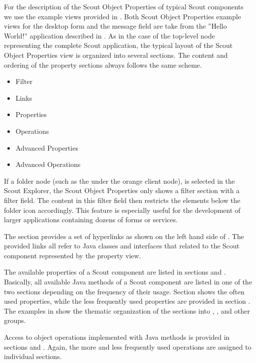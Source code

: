 \documentclass[a4paper,10pt,twoside]{book}
\begin{document}
For the description of the Scout Object Properties of typical Scout components we use the example views provided in . 
Both Scout Object Properties example views for the desktop form and the message field are take from the ''Hello World!'' application described in . 
As in the case of the top-level node representing the complete Scout application, the typical layout of the Scout Object Properties view is organized into several sections. 
The content and ordering of the property sections always follows the same scheme.

\begin{itemize}
  \item Filter
  \item Links
  \item Properties
  \item Operations
  \item Advanced Properties
  \item Advanced Operations
\end{itemize}

If a folder node (such as the  under the orange client node), is selected in the Scout Explorer, the Scout Object Properties only shows a filter section with a filter field. 
The content in this filter field then restricts the elements below the folder icon accordingly. 
This feature is especially useful for the development of larger applications containing dozens of forms or services. 

The  section provides a set of hyperlinks as shown on the left hand side of . 
The provided links all refer to Java classes and interfaces that related to the Scout component represented by the property view. 

The available properties of a Scout component are listed in sections  and . 
Basically, all available Java  methods of a Scout component are listed in one of the two sections depending on the frequency of their usage. 
Section  shows the often used properties, while the less frequently used properties are provided in section . 
The examples in  show the thematic organization of the sections into , ,  and other groups.

Access to object operations implemented with Java  methods is provided in sections  and . 
Again, the more and less frequently used operations are assigned to individual sections. 
\end{document}
